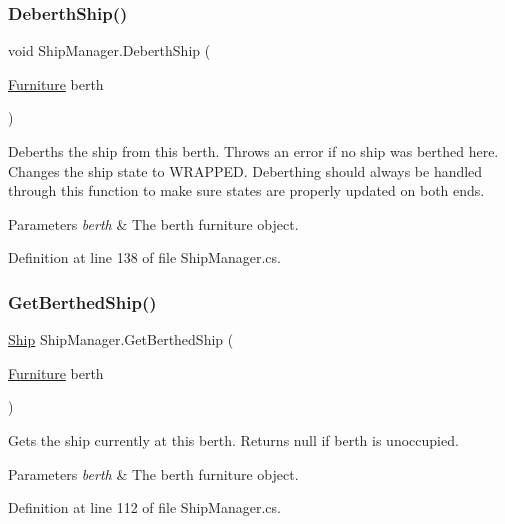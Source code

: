 \subsubsection{\texorpdfstring{Deberth\+Ship()}{DeberthShip()}}
{\footnotesize\ttfamily void Ship\+Manager.\+Deberth\+Ship (\begin{DoxyParamCaption}\item[{\hyperlink{class_furniture}{Furniture}}]{berth }\end{DoxyParamCaption})}



Deberths the ship from this berth. Throws an error if no ship was berthed here. Changes the ship state to W\+R\+A\+P\+P\+ED. Deberthing should always be handled through this function to make sure states are properly updated on both ends. 


\begin{DoxyParams}{Parameters}
{\em berth} & The berth furniture object.\\
\hline
\end{DoxyParams}


Definition at line 138 of file Ship\+Manager.\+cs.

\mbox{\label{class_ship_manager_a105f42a557a914a51310cf37be5624d9}} 
\subsubsection{\texorpdfstring{Get\+Berthed\+Ship()}{GetBerthedShip()}}
{\footnotesize\ttfamily \hyperlink{class_ship}{Ship} Ship\+Manager.\+Get\+Berthed\+Ship (\begin{DoxyParamCaption}\item[{\hyperlink{class_furniture}{Furniture}}]{berth }\end{DoxyParamCaption})}



Gets the ship currently at this berth. Returns null if berth is unoccupied. 


\begin{DoxyParams}{Parameters}
{\em berth} & The berth furniture object.\\
\hline
\end{DoxyParams}


Definition at line 112 of file Ship\+Manager.\+cs.

